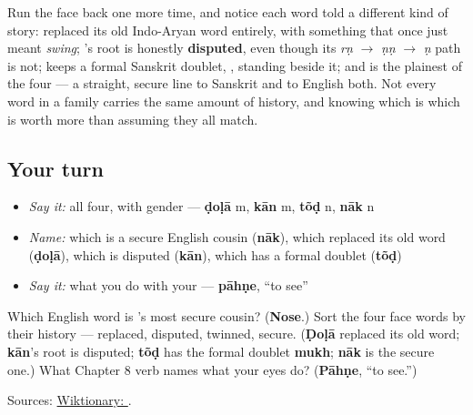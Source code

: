 \begin{culture}
Run the face back one more time, and notice each word told a different kind of story: \textbf{} replaced its old Indo-Aryan word entirely, with something that once just meant \emph{swing}; \textbf{}'s root is honestly \textbf{disputed}, even though its \emph{rṇ} $\to$ \emph{ṇṇ} $\to$ \emph{ṇ} path is not; \textbf{} keeps a formal Sanskrit doublet, \textbf{}, standing beside it; and \textbf{} is the plainest of the four — a straight, secure line to Sanskrit and to English both. Not every word in a family carries the same amount of history, and knowing which is which is worth more than assuming they all match.
\end{culture}

\subsection*{Your turn}
\begin{itemize}
\raggedright
  \item \emph{Say it:} all four, with gender — \textbf{ḍoḷā} m, \textbf{kān} m, \textbf{tõḍ} n, \textbf{nāk} n
  \item \emph{Name:} which is a secure English cousin (\textbf{nāk}), which replaced its old word (\textbf{ḍoḷā}), which is disputed (\textbf{kān}), which has a formal doublet (\textbf{tõḍ})
  \item \emph{Say it:} what you do with your \textbf{} — \textbf{pāhṇe}, \textquotedblleft{}to see\textquotedblright{}
\end{itemize}

\begin{tcolorbox}[breakable,colback=teal!4,colframe=teal!35!black,title={Before you move on}]
Which English word is \textbf{}'s most secure cousin? (\textbf{Nose}.) Sort the four face words by their history — replaced, disputed, twinned, secure. (\textbf{Ḍoḷā} replaced its old word; \textbf{kān}'s root is disputed; \textbf{tõḍ} has the formal doublet \textbf{mukh}; \textbf{nāk} is the secure one.) What Chapter 8 verb names what your eyes do? (\textbf{Pāhṇe}, \textquotedblleft{}to see.\textquotedblright{})

Sources: \href{https://en.wiktionary.org/wiki/\%E0\%A4\%A8\%E0\%A4\%BE\%E0\%A4\%95}{Wiktionary: }.
\end{tcolorbox}
